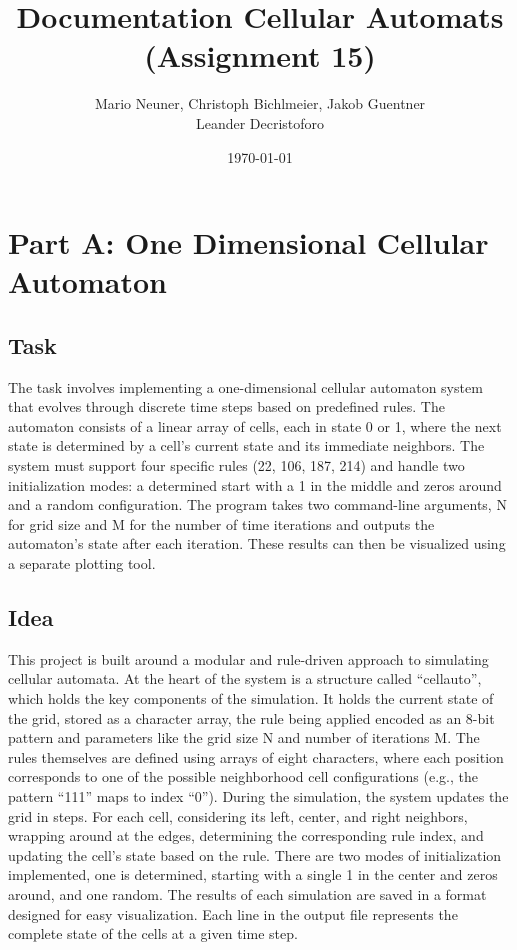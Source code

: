 \documentclass[12pt,a4paper]{article}
\title{\textbf{Documentation Cellular Automats (Assignment 15)}}
\author{Mario Neuner, Christoph Bichlmeier, Jakob Guentner\\Leander Decristoforo}
\date{\today}
\begin{document}
\maketitle

\newpage
\tableofcontents
\pagebreak


\section{Part A: One Dimensional Cellular Automaton}
\vspace{1cm}


\subsection{Task}
The task involves implementing a one-dimensional cellular automaton system that 
evolves through discrete time steps based on predefined rules. The automaton consists 
of a linear array of cells, each in state 0 or 1, where the next state is determined by 
a cell's current state and its immediate neighbors. The system must support four specific 
rules (22, 106, 187, 214) and handle two initialization modes: a determined start with a 1 
in the middle and zeros around and a random configuration. The program takes two command-line 
arguments, N for grid size and M for the number of time iterations and outputs the automaton's 
state after each iteration. These results can then be visualized using a separate plotting tool.
\newline

\vspace{1cm}


\subsection{Idea}
This project is built around a modular and rule-driven approach to simulating cellular automata. 
At the heart of the system is a structure called “cellauto”, which holds the key components of the 
simulation. It holds the current state of the grid, stored as a character array, the rule being applied 
encoded as an 8-bit pattern and parameters like the grid size N and number of iterations M.
\newline
The rules themselves are defined using arrays of eight characters, where each position corresponds to 
one of the possible neighborhood cell configurations (e.g., the pattern “111” maps to index “0”). During 
the simulation, the system updates the grid in steps. For each cell, considering its left, center, and right 
neighbors, wrapping around at the edges, determining the corresponding rule index, and updating the cell’s 
state based on the rule.
\newline
There are two modes of initialization implemented, one is determined, starting with a 
single 1 in the center and zeros around, and one random. 
The results of each simulation are saved in a format designed for easy visualization. 
Each line in the output file represents the complete state of the cells at a given time step.
\newline
\end{document}
